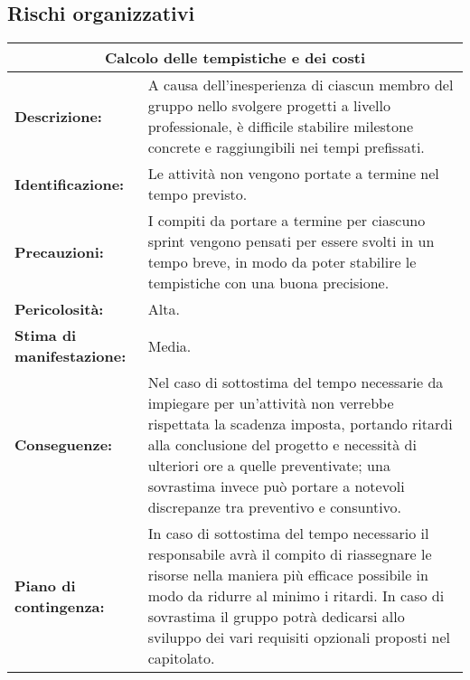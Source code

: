 \subsection{Rischi organizzativi}

\renewcommand\tabularxcolumn[1]{>{\Centering}m{#1}}
\begin{tabularx}{\textwidth}{|X|X|}
\hline
\multicolumn{2}{|c|}{\textbf{Calcolo delle tempistiche e dei costi}} \\
\hline
\textbf{Descrizione:}& A causa dell'inesperienza di ciascun membro del gruppo nello svolgere progetti a livello professionale, è difficile stabilire milestone concrete e raggiungibili nei tempi prefissati. \\
\hline
\textbf{Identificazione:}& Le attività non vengono portate a termine nel tempo previsto. \\
\hline
\textbf{Precauzioni:}& I compiti da portare a termine per ciascuno sprint vengono pensati per essere svolti in un tempo breve, in modo da poter stabilire le tempistiche con una buona precisione. \\
\hline
\textbf{Pericolosità:}& Alta.\\
\hline
\textbf{Stima di manifestazione:}& Media.\\
\hline
\textbf{Conseguenze:}& Nel caso di sottostima del tempo necessarie da impiegare per un'attività non verrebbe rispettata la scadenza imposta, portando ritardi alla conclusione del progetto e necessità di ulteriori ore a quelle preventivate; una sovrastima invece può portare a notevoli discrepanze tra preventivo e consuntivo. \\
\hline
\textbf{Piano di contingenza:}& In caso di sottostima del tempo necessario il responsabile avrà il compito di riassegnare le risorse nella maniera più efficace possibile in modo da ridurre al minimo i ritardi. In caso di sovrastima il gruppo potrà dedicarsi allo sviluppo dei vari requisiti opzionali proposti nel capitolato.\\
\hline
\end{tabularx}

\vspace{20pt}

